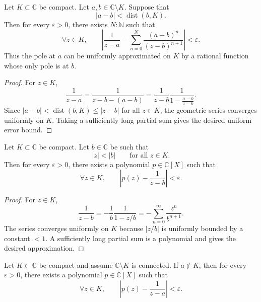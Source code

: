 \documentclass[a4paper]{article}
\newcommand{\C}{\mathbb{C}}
\newcommand{\eps}{\varepsilon}
\newcommand{\dist}{\operatorname{dist}}
\begin{document}
\begin{lemma}
\label{lem:local_pole_moving}
Let \(K \subset \C\) be compact. Let \(a,b \in \C \setminus K\). Suppose that
\[
  |a-b| < \dist(b,K).
\]
Then for every \(\eps > 0\), there exists \(N : \mathbb{N}\) such that
\[
  \forall z \in K,\qquad
  \left|
    \frac{1}{z-a}
    -
    \sum_{n=0}^{N}
      \frac{(a-b)^n}{(z-b)^{n+1}}
  \right|
  < \eps .
\]
Thus the pole at \(a\) can be uniformly approximated on \(K\) by a rational
function whose only pole is at \(b\).
\end{lemma}

\begin{proof}
For \(z \in K\),
\[
  \frac{1}{z-a}
  =
  \frac{1}{z-b-(a-b)}
  =
  \frac{1}{z-b}
  \frac{1}{1-\frac{a-b}{z-b}} .
\]
Since \(|a-b| < \dist(b,K) \le |z-b|\) for all \(z \in K\), the geometric
series converges uniformly on \(K\). Taking a sufficiently long partial sum
gives the desired uniform error bound.
\end{proof}

\begin{lemma}
\label{lem:far_pole_polynomial}
Let \(K \subset \C\) be compact. Let \(b \in \C\) be such that
\[
  |z| < |b|
  \qquad \text{for all } z \in K .
\]
Then for every \(\eps > 0\), there exists a polynomial \(p \in \C[X]\) such that
\[
  \forall z \in K,\qquad
  \left|p(z)-\frac{1}{z-b}\right| < \eps .
\]
\end{lemma}

\begin{proof}
For \(z \in K\),
\[
  \frac{1}{z-b}
  =
  -\frac{1}{b}\frac{1}{1-z/b}
  =
  -\sum_{n=0}^{\infty} \frac{z^n}{b^{n+1}} .
\]
The series converges uniformly on \(K\) because \(|z/b|\) is uniformly bounded
by a constant \(<1\). A sufficiently long partial sum is a polynomial and gives
the desired approximation.
\end{proof}

\begin{proposition}
\label{prop:single_pole_polynomial}
Let \(K \subset \C\) be compact and assume \(\C \setminus K\) is connected. If
\(a \notin K\), then for every \(\eps > 0\), there exists a polynomial
\(p \in \C[X]\) such that
\[
  \forall z \in K,\qquad
  \left|p(z)-\frac{1}{z-a}\right| < \eps .
\]
\end{proposition}
\end{document}
